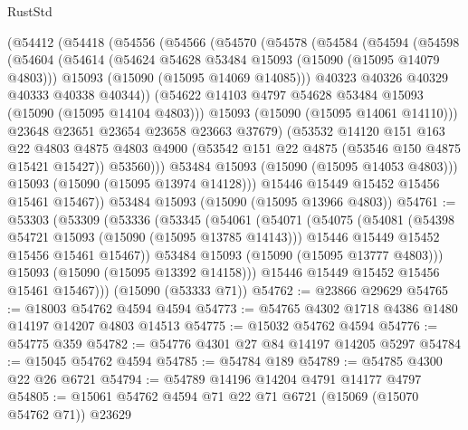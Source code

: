 \begin{lexlean}{RustStd}
\begin{coremodule}
    (@54412
      (@54418
        (@54556
          (@54566
            (@54570
              (@54578
                (@54584
                  (@54594
                    (@54598
                      (@54604
                        (@54614
                          (@54624 @54628 @53484 @15093 (@15090 (@15095 @14079 @4803)))
                          @15093
                          (@15090 (@15095 @14069 @14085)))
                        @40323
                        @40326
                        @40329
                        @40333
                        @40338
                        @40344))
                    (@54622 @14103 @4797 @54628 @53484 @15093 (@15090 (@15095 @14104 @4803)))
                    @15093
                    (@15090 (@15095 @14061 @14110)))
                  @23648
                  @23651
                  @23654
                  @23658
                  @23663
                  @37679)
                (@53532
                  @14120
                  @151
                  @163
                  @22
                  @4803
                  @4875
                  @4803
                  @4900
                  (@53542 @151 @22 @4875 (@53546 @150 @4875 @15421 @15427))
                  @53560)))
            @53484
            @15093
            (@15090 (@15095 @14053 @4803)))
          @15093
          (@15090 (@15095 @13974 @14128)))
        @15446
        @15449
        @15452
        @15456
        @15461
        @15467))
    @53484
    @15093
    (@15090 (@15095 @13966 @4803))
@54761 := @53303
    (@53309
      (@53336
        (@53345
          (@54061
            (@54071
              (@54075
                (@54081
                  (@54398 @54721 @15093 (@15090 (@15095 @13785 @14143)))
                  @15446
                  @15449
                  @15452
                  @15456
                  @15461
                  @15467))
              @53484
              @15093
              (@15090 (@15095 @13777 @4803)))
            @15093
            (@15090 (@15095 @13392 @14158)))
          @15446
          @15449
          @15452
          @15456
          @15461
          @15467)))
    (@15090 (@53333 @71))
@54762 := @23866 @29629
@54765 := @18003 @54762 @4594 @4594
@54773 := @54765 @4302 @1718 @4386 @1480 @14197 @14207 @4803 @14513
@54775 := @15032 @54762 @4594
@54776 := @54775 @359
@54782 := @54776 @4301 @27 @84 @14197 @14205 @5297
@54784 := @15045 @54762 @4594
@54785 := @54784 @189
@54789 := @54785 @4300 @22 @26 @6721
@54794 := @54789 @14196 @14204 @4791 @14177 @4797
@54805 := @15061 @54762 @4594 @71 @22 @71 @6721 (@15069 (@15070 @54762 @71)) @23629

\end{coremodule}
\end{lexlean}
